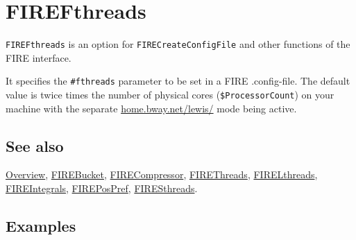 \documentclass[../FeynHelpersManual.tex]{subfiles}
\begin{document}
\hypertarget{firefthreads}{
\section{FIREFthreads}\label{firefthreads}}

\texttt{FIREFthreads} is an option for \texttt{FIRECreateConfigFile} and
other functions of the FIRE interface.

It specifies the \texttt{\#{}\allowbreak{}fthreads} parameter to be set
in a FIRE .config-file. The default value is twice times the number of
physical cores (\texttt{\$ProcessorCount}) on your machine with the
separate \hyperlink{home.bway.net/lewis/}{home.bway.net/lewis/} mode
being active.

\subsection{See also}

\hyperlink{toc}{Overview}, \hyperlink{firebucket}{FIREBucket},
\hyperlink{firecompressor}{FIRECompressor},
\hyperlink{firethreads}{FIREThreads},
\hyperlink{firelthreads}{FIRELthreads},
\hyperlink{fireintegrals}{FIREIntegrals},
\hyperlink{firepospref}{FIREPosPref},
\hyperlink{firesthreads}{FIRESthreads}.

\subsection{Examples}
\end{document}
